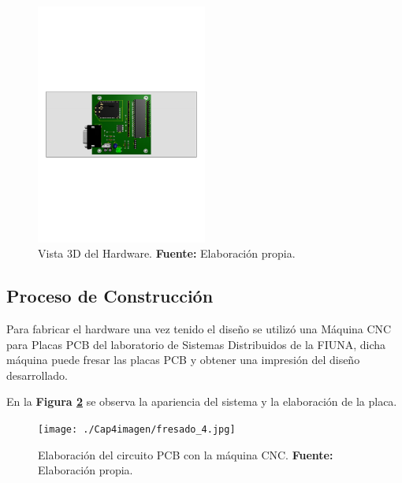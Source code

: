 




\begin{figure}[H]
	\centering
		\includegraphics[trim = 10mm 100mm 5mm 100mm, clip, width=0.5\textwidth]{./Cap4imagen/3d_vista_arriba_4.pdf}
	\caption[Vista 3D del Hardware.]{Vista 3D del Hardware.\textbf{ Fuente:} Elaboración propia.}
	\label{Esch7} %
\end{figure}



\subsection{Proceso de Construcción}

Para fabricar el hardware una vez tenido el diseño se utilizó una Máquina CNC para Placas PCB del laboratorio de Sistemas Distribuidos de la FIUNA, dicha máquina puede fresar las placas PCB y obtener una impresión del diseño desarrollado. 

En la \textbf{Figura \ref{Esch8}} se observa la apariencia del sistema y la elaboración de la placa. 


\begin{figure}[H]
	\centering
		\texttt{[image: ./Cap4imagen/fresado\_4.jpg]}
	\caption[Elaboración del circuito PCB con la máquina CNC.]{Elaboración del circuito PCB con la máquina CNC.\textbf{ Fuente:} Elaboración propia.}
	\label{Esch8} %
\end{figure}

